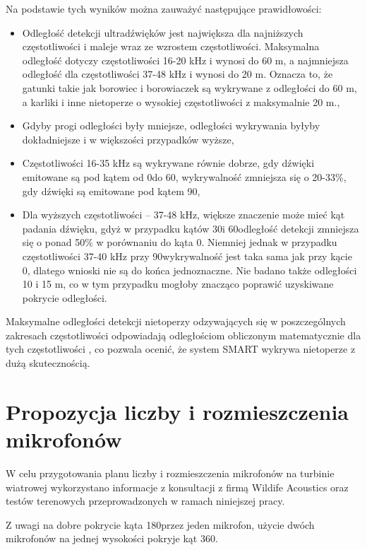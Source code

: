 \documentclass{sprz}
\begin{document}
\newpage
Na podstawie tych wyników można zauważyć następujące prawidłowości:
\begin{itemize}
  \item{Odległość detekcji ultradźwięków jest największa dla najniższych częstotliwości i maleje wraz ze wzrostem częstotliwości. Maksymalna odległość dotyczy częstotliwości 16-20 kHz i wynosi do 60 m, a najmniejsza odległość dla częstotliwości 37-48 kHz i wynosi do 20 m. Oznacza to, że gatunki takie jak borowiec i borowiaczek są wykrywane z odległości do 60 m, a karliki i inne nietoperze o wysokiej częstotliwości z maksymalnie 20 m.,}
  \item{Gdyby progi odległości były mniejsze, odległości wykrywania byłyby dokładniejsze i w większości przypadków wyższe,}
  \item{Częstotliwości 16-35 kHz są wykrywane równie dobrze, gdy dźwięki emitowane są pod kątem od 0\textdegree do 60\textdegree, wykrywalność zmniejsza się o 20-33\%, gdy dźwięki są emitowane pod kątem 90\textdegree,}
  \item{Dla wyższych częstotliwości – 37-48 kHz, większe znaczenie może mieć kąt padania dźwięku, gdyż w przypadku kątów 30\textdegree i 60\textdegree odległość detekcji zmniejsza się o ponad 50\% w porównaniu do kąta 0\textdegree. Niemniej jednak w przypadku częstotliwości 37-40 kHz przy 90\textdegree wykrywalność jest taka sama jak przy kącie 0\textdegree, dlatego wnioski nie są do końca jednoznaczne. Nie badano także odległości 10 i 15 m, co w tym przypadku mogłoby znacząco poprawić uzyskiwane pokrycie odległości.}
\end{itemize}

Maksymalne odległości detekcji nietoperzy odzywających się w poszczególnych zakresach częstotliwości odpowiadają odległościom obliczonym matematycznie dla tych częstotliwości \cite{agranat}, co pozwala ocenić, że system SMART wykrywa nietoperze z dużą skutecznością.

\section{Propozycja liczby i rozmieszczenia mikrofonów}
W celu przygotowania planu liczby i rozmieszczenia mikrofonów na turbinie wiatrowej wykorzystano informacje z konsultacji z firmą Wildife Acoustics oraz testów terenowych przeprowadzonych w ramach niniejszej pracy.

Z uwagi na dobre pokrycie kąta 180\textdegree przez jeden mikrofon, użycie dwóch mikrofonów na jednej wysokości pokryje kąt 360\textdegree.
\end{document}
